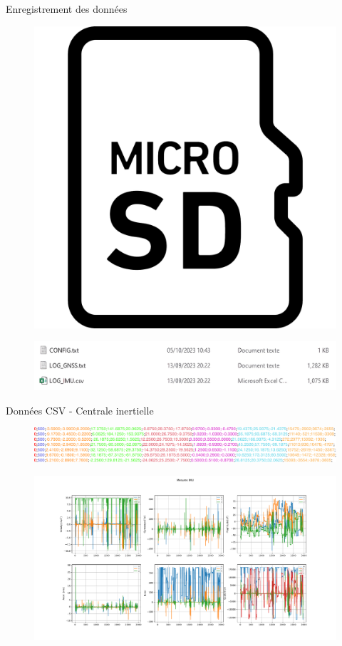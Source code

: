 \documentclass{beamer}
\begin{document}
\begin{frame}{Enregistrement des données}
\begin{figure}[h]
	\centering
	\includegraphics[width=0.3\linewidth]{../figures/presentation/micro-sd-card-illustration-material-3-svgrepo-com}
\end{figure}
\begin{figure}[h]
	\centering
	\includegraphics[width=0.9\linewidth]{../figures/presentation/Fichiers-mesures}
\end{figure}
\end{frame}

\begin{frame}{Données CSV - Centrale inertielle}
	\begin{figure}[h]
		\centering
		\includegraphics[width=1\linewidth]{../figures/code/donbnees-csv}
	\end{figure}
	\begin{figure}[h]
		\centering
		\includegraphics[width=1\linewidth]{../figures/application/mesures}
	\end{figure}
\end{frame}
\end{document}

